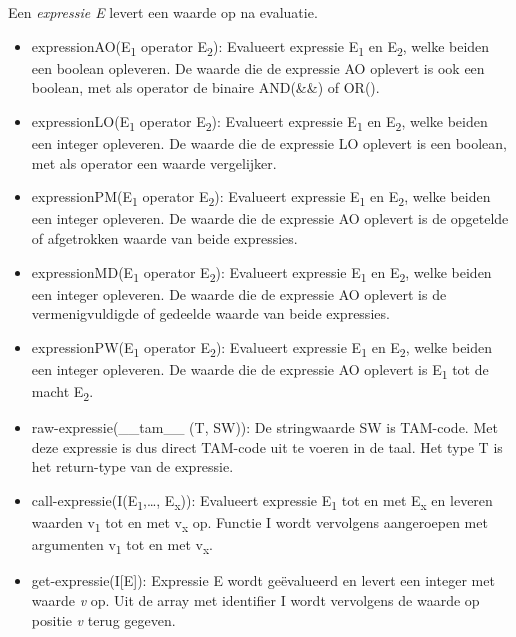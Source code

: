 Een \emph{expressie E} levert een waarde op na evaluatie.
\begin{itemize}
    \item expressionAO(E\textsubscript{1} operator E\textsubscript{2}): Evalueert expressie E\textsubscript{1} en E\textsubscript{2}, welke beiden een boolean opleveren. De waarde die de expressie AO oplevert is ook een boolean, met als operator de binaire AND(\&\&) of OR(\textbar\textbar).
    \item expressionLO(E\textsubscript{1} operator E\textsubscript{2}): Evalueert expressie E\textsubscript{1} en E\textsubscript{2}, welke beiden een integer opleveren. De waarde die de expressie LO oplevert is een boolean, met als operator een waarde vergelijker.
    \item expressionPM(E\textsubscript{1} operator E\textsubscript{2}): Evalueert expressie E\textsubscript{1} en E\textsubscript{2}, welke beiden een integer opleveren. De waarde die de expressie AO oplevert is de opgetelde of afgetrokken waarde van beide expressies.
    \item expressionMD(E\textsubscript{1} operator E\textsubscript{2}): Evalueert expressie E\textsubscript{1} en E\textsubscript{2}, welke beiden een integer opleveren. De waarde die de expressie AO oplevert is de vermenigvuldigde of gedeelde waarde van beide expressies.
    \item expressionPW(E\textsubscript{1} operator E\textsubscript{2}): Evalueert expressie E\textsubscript{1} en E\textsubscript{2}, welke beiden een integer opleveren. De waarde die de expressie AO oplevert is E\textsubscript{1} tot de macht E\textsubscript{2}.
    \item raw-expressie(\_\_tam\_\_ (T, SW)): De stringwaarde SW is TAM-code. Met deze expressie is dus direct TAM-code uit te voeren in de taal. Het type T is het return-type van de expressie.
    \item call-expressie(I(E\textsubscript{1},\dots, E\textsubscript{x})): Evalueert expressie E\textsubscript{1} tot en met E\textsubscript{x} en leveren waarden v\textsubscript{1} tot en met v\textsubscript{x} op. Functie I wordt vervolgens aangeroepen met argumenten v\textsubscript{1} tot en met v\textsubscript{x}.
    \item get-expressie(I[E]): Expressie E wordt ge\"evalueerd en levert een integer met waarde \emph{v} op. Uit de array met identifier I wordt vervolgens de waarde op positie \emph{v} terug gegeven.
\end{itemize}

